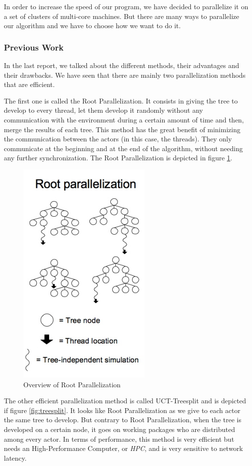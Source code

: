 In order to increase the speed of our program, we have decided to parallelize it on a set of clusters of multi-core machines. But there are many ways to parallelize our algorithm and we have to choose how we want to do it. 
\subsubsection{Previous Work}
In the last report, we talked about the different methods, their advantages and their drawbacks. We have seen that there are mainly two parallelization methods that are efficient.

The first one is called the Root Parallelization. It consists in giving the tree to develop to every thread, let them develop it randomly without any communication with the environment
during a certain amount of time and then, merge the results of each tree.
This method has the great benefit of minimizing the communication between the actors (in this case, the threads).
They only communicate at the beginning and at the end of the algorithm, without needing any further synchronization. The Root Parallelization is depicted in figure \ref{fig:root}.

\begin{figure}[!h] 
\centerline{\includegraphics[scale=0.60]{3Methods/3.1Parallelization_Method/root.png}}
   \caption{\label{étiquette} Overview of Root Parallelization}
\label{fig:root}
\end{figure}

The other efficient parallelization method is called UCT-Treesplit and is depicted if figure \ref{fig:treesplit}. It looks like Root Parallelization as we give to each actor the same tree to develop.
But contrary to Root Parallelization, when the tree is developed on a certain node, it goes on working packages who are distributed among every actor. %
In terms of performance, this method is very efficient but needs an High-Performance Computer, or \emph{HPC}, and is very sensitive to network latency.

